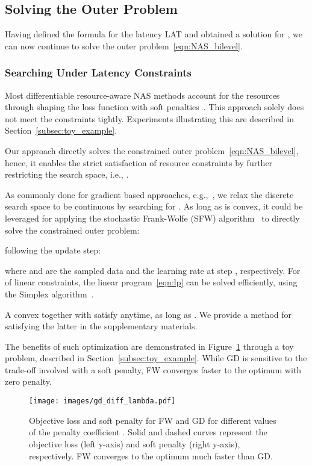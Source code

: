 \documentclass[dvipsnames,table,xcdraw]{article}
\begin{document}
\subsection{Solving the Outer Problem}
\label{sec:outer_problem}
Having defined the formula for the latency LAT and obtained a solution for , we can now continue to solve the outer problem~\eqref{eqn:NAS_bilevel}. 

\subsubsection{Searching Under Latency Constraints}
Most differentiable resource-aware NAS methods account for the resources through shaping the loss function with soft penalties~\cite{fbnet, TF-NAS}. This approach solely does not meet the constraints tightly.
Experiments illustrating this are described in Section~\ref{subsec:toy_example}.

Our approach directly solves the constrained outer problem~\eqref{eqn:NAS_bilevel}, hence, it enables the strict satisfaction of resource constraints by further restricting the search space, i.e.,
.

As commonly done for gradient based approaches, e.g.,~\cite{liu2018darts}, we relax the discrete search space  to be continuous by searching for .
As long as  is convex, it could be leveraged for applying the stochastic Frank-Wolfe (SFW) algorithm~\cite{SFW} to directly solve the constrained outer problem:

following the update step:

where  and  are the sampled data and the learning rate at step , respectively.
For  of linear constraints, the linear program~\eqref{eqn:lp} can be solved efficiently, using the Simplex algorithm~\cite{simplex}.

A convex  together with  satisfy  anytime, as long as .
We provide a method for satisfying the latter in the supplementary materials.

The benefits of such optimization are demonstrated in Figure~\ref{fig:fw_vs_gd} through a toy problem, described in Section~\ref{subsec:toy_example}. While GD is sensitive to the trade-off involved with a soft penalty, FW converges faster to the optimum with zero penalty. 

\begin{figure}[htb]
    \centering
    \texttt{[image: images/gd\_diff\_lambda.pdf]}
    \caption{Objective loss and soft penalty for FW and GD for different values of the penalty coefficient . Solid and dashed curves represent the objective loss (left y-axis) and soft penalty (right y-axis), respectively. FW converges to the optimum much faster than GD.}
    \label{fig:fw_vs_gd}
\end{figure}
\end{document}
